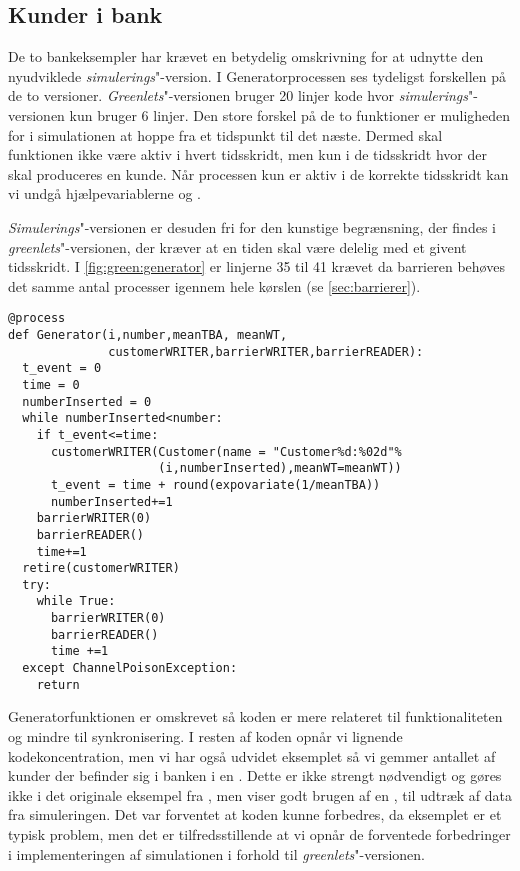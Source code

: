 \subsection{Kunder i bank}
De to bankeksempler har krævet en betydelig omskrivning for at udnytte den nyudviklede \emph{simulerings}"-version. I Generatorprocessen ses tydeligst forskellen på de to versioner. \emph{Greenlets}"-versionen bruger 20 linjer kode hvor \emph{simulerings}"-versionen kun bruger 6 linjer. Den store forskel på de to funktioner er muligheden for i simulationen  at hoppe fra et tidspunkt til det næste. Dermed skal funktionen ikke være aktiv i hvert tidsskridt, men kun i de tidsskridt hvor der skal produceres en kunde. Når processen kun er aktiv i de korrekte tidsskridt kan vi undgå hjælpevariablerne  og . 

\emph{Simulerings}"-versionen er desuden fri for den kunstige begrænsning, der findes i \emph{greenlets}"-versionen, der kræver at en tiden skal være delelig med et givent tidsskridt. I \cref{fig:green:generator} er linjerne 35 til 41 krævet da barrieren behøves det samme antal processer igennem hele kørslen (se \cref{sec:barrierer}). 

\begin{lstlisting}[firstnumber=21, label=fig:green:generator, caption=Generatorprocessen for Greenlets versionen]
@process
def Generator(i,number,meanTBA, meanWT,
              customerWRITER,barrierWRITER,barrierREADER):
  t_event = 0
  time = 0
  numberInserted = 0
  while numberInserted<number:
    if t_event<=time:
      customerWRITER(Customer(name = "Customer%d:%02d"%
                     (i,numberInserted),meanWT=meanWT))
      t_event = time + round(expovariate(1/meanTBA))
      numberInserted+=1
    barrierWRITER(0)
    barrierREADER()
    time+=1
  retire(customerWRITER)
  try:
    while True:
      barrierWRITER(0)
      barrierREADER()
      time +=1
  except ChannelPoisonException: 
    return
\end{lstlisting}

Generatorfunktionen er omskrevet så koden er mere relateret til funktionaliteten og mindre til synkronisering.  I resten af koden opnår vi lignende kodekoncentration, men vi har også udvidet eksemplet så vi gemmer antallet af kunder der befinder sig i banken i en . Dette er ikke strengt nødvendigt og gøres ikke i det originale eksempel fra \simpy, men viser godt brugen af en , til udtræk af data fra simuleringen. Det var  forventet at koden kunne forbedres, da eksemplet er et typisk \des problem, men det er tilfredsstillende at vi opnår de forventede forbedringer i implementeringen af simulationen i forhold til \emph{greenlets}"-versionen.


